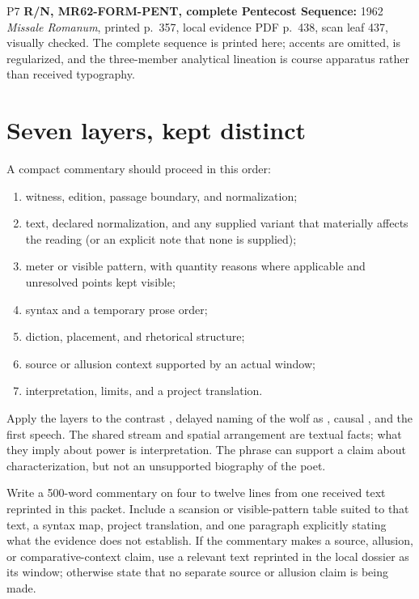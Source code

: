 \begin{courseunit}{P7}
\textbf{R/N, MR62-FORM-PENT, complete Pentecost Sequence:} 1962
\textit{Missale Romanum}, printed p.~357, local evidence PDF p.~438, scan leaf
437, visually checked. The complete sequence is printed here; accents are
omitted,  is regularized, and the three-member analytical lineation
is course apparatus rather than received typography.
\begin{quote}
\small
\PoetryPentecostSequenceComplete
\end{quote}

\section{Seven layers, kept distinct}

A compact commentary should proceed in this order:

\begin{enumerate}
\item witness, edition, passage boundary, and normalization;
\item text, declared normalization, and any supplied variant that materially
affects the reading (or an explicit note that none is supplied);
\item meter or visible pattern, with quantity reasons where applicable and
unresolved points kept visible;
\item syntax and a temporary prose order;
\item diction, placement, and rhetorical structure;
\item source or allusion context supported by an actual window;
\item interpretation, limits, and a project translation.
\end{enumerate}

Apply the layers to the contrast , delayed naming of
the wolf as , causal , and the first speech.
The shared stream and spatial arrangement are textual facts; what they imply
about power is interpretation. The phrase  can support a
claim about characterization, but not an unsupported biography of the poet.

Write a 500-word commentary on four to twelve lines from one received text
reprinted in this packet. Include a scansion or visible-pattern table suited
to that text, a syntax map, project translation, and one paragraph explicitly
stating what the evidence does not establish. If the commentary makes a
source, allusion, or comparative-context claim, use a relevant text reprinted
in the local dossier as its window; otherwise state that no separate source or
allusion claim is being made.


\end{courseunit}
